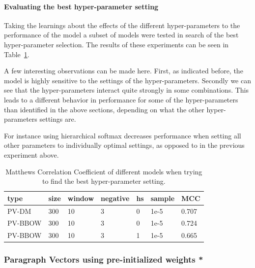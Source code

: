 
\paragraph{Evaluating the best hyper-parameter setting}

Taking the learnings about the effects of the different hyper-parameters to the performance of the model a subset of models were tested in search of the best hyper-parameter selection. The results of these experiments can be seen in Table~\ref{tab:Paragraph Vector Parameter Results Best}.

A few interesting observations can be made here. First, as indicated before, the model is highly sensitive to the settings of the hyper-parameters. Secondly we can see that the hyper-parameters interact quite strongly in some combinations. This leads to a different behavior in performance for some of the hyper-parameters than identified in the above sections, depending on what the other hyper-parameters settings are.

For instance using hierarchical softmax decreases performance when setting all other parameters to individually optimal settings, as opposed to in the previous experiment above.

\begin{table}[h]
  \begin{center}
  \begin{tabular}{ *6l | l }
    \toprule
    type & size & window & negative & hs & sample & MCC  \\
    \midrule
    PV-DM & 300 & 10 & 3 & 0 & 1e-5 & 0.707 \\
    PV-BBOW & 300 & 10 & 3 & 0 & 1e-5 & 0.724 \\
    PV-BBOW & 300 & 10 & 3 & 1 & 1e-5 & 0.665 \\
    \bottomrule
  \end{tabular}
  \caption{Matthews Correlation Coefficient of different models when trying to find the best hyper-parameter setting.}
\label{tab:Paragraph Vector Parameter Results Best}
\end{center}
\end{table}


\subsubsection{Paragraph Vectors using pre-initialized weights *}

